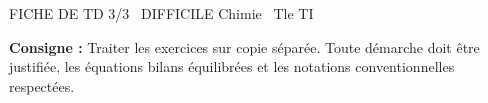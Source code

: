 \documentclass[11pt]{article}
\begin{document}
\begin{tcolorbox}[enhanced,colback=popink,colframe=popink,arc=10pt,boxrule=0pt,left=12pt,right=12pt,top=9pt,bottom=9pt]
{\color{white}\popxbold\small FICHE DE TD 3/3 \textbullet\ DIFFICILE \hfill Chimie \textbullet\ Tle TI\par}
\end{tcolorbox}
\vspace{4pt}
\noindent \textbf{Consigne :} Traiter les exercices sur copie séparée. Toute démarche doit être justifiée, les équations bilans équilibrées et les notations conventionnelles respectées.
\end{document}
